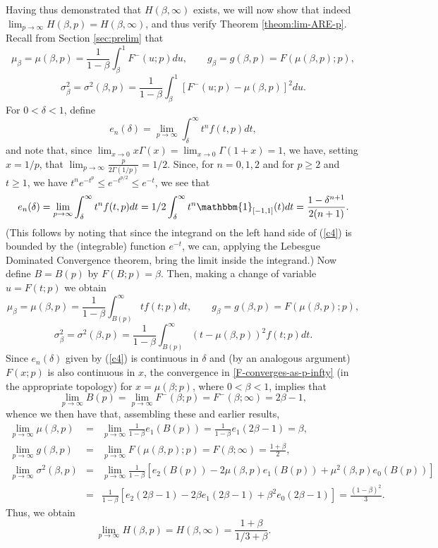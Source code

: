 \documentclass[11pt]{article}
\newcommand{\be}{\begin{equation}}
\newcommand{\ee}{\end{equation}}
\newcommand{\bas}{\begin{eqnarray*}}
\newcommand{\eas}{\end{eqnarray*}}
\newcommand{\indicator}[1]{\mathbbm{1}_{{#1}}}
\newcommand{\nc}{\normalcolor}
\begin{document}
Having thus demonstrated that $H(\beta,\infty)$ exists, we will now show that
indeed $\lim_{p\rightarrow\infty} H(\beta,p) = H(\beta,\infty)$, and
thus verify  Theorem \ref{theom:lim-ARE-p}.  \nc Recall from Section \ref{sec:prelim} that
\[
\mu_{\beta} = \mu(\beta,p) =\frac{1}{1-\beta} \int_{\beta}^1 F^{-}(u;p)du, \qquad
g_{\beta} = g(\beta,p) =F(\mu(\beta,p);p), 
\]
\[
\sigma_{\beta}^2 = \sigma^2 (\beta,p) = \frac{1}{1-\beta} \int_{\beta}^1 [F^{-}(u;p)-\mu(\beta,p)]^2 du.
\] 
For $0 < \delta < 1$, define 
\[ 
e_n(\delta) =\lim_{p \rightarrow \infty} \int_{\delta}^\infty t^n
f(t,p) dt, 
\]
and note that,  since $\lim_{x\rightarrow
  0}x\Gamma(x)=\lim_{x\rightarrow 0}\Gamma(1+x)=1$, we have, setting
$x=1/p$, that \nc $\lim_{p \rightarrow \infty} \frac{p}{2\Gamma(1/p)} = 1/2$.
Since, for $n=0,1,2$ and for $p \ge 2$ and $t \ge 1$, we have $t^n e^{-t^p} \le e^{-t^{p/2}} \le e^{-t}$, we see that 
\be \label{c4}
e_n(\delta) =\lim_{p \rightarrow \infty} \int_{\delta}^\infty t^n f(t,p) dt = 1/2 \int_{\delta}^\infty t^n \indicator{[-1,1]}(t) dt = \frac{1-\delta^{n+1}}{2(n+1)}.
\ee
 (This follows by noting that since the integrand on the left hand side
of (\ref{c4}) is bounded by the (integrable) function $e^{-t}$, we
can, applying the Lebesgue Dominated Convergence theorem, bring the
limit inside the integrand.) \nc Now define $B = B(p)$ by $F(B;p) = \beta$. Then, making a change of variable $u = F(t;p)$ we obtain
\[
\mu_{\beta} = \mu(\beta,p) = \frac{1}{1-\beta} \int_{B(p)}^{\infty} t f(t;p) dt, \qquad
g_{\beta} = g(\beta,p) =F(\mu(\beta,p);p), 
\]
\[
\sigma_{\beta}^2 = \sigma^2 (\beta,p) = \frac{1}{1-\beta} \int_{B(p)}^{\infty} (t-\mu(\beta,p))^2 f(t;p) dt.
\]
%
Since $e_n(\delta)$ given by (\ref{c4}) is continuous in $\delta$ and
(by an analogous argument) $F(x;p)$ is also continuous in $x$, the
convergence in \eqref{F-converges-as-p-infty} (in
the appropriate topology)  for $x=\mu(\beta;p)$, where $0 < \beta <1$, implies that
\[
\lim_{p \rightarrow \infty} B(p) = \lim_{p \rightarrow \infty} F^{-}(\beta;p) = F^{-}(\beta;\infty) = 2\beta -1,
\]
whence we then have that, assembling these and earlier results, \nc  
\bas
\lim_{p \rightarrow \infty} \mu(\beta,p) &=& \lim_{p \rightarrow \infty} \frac{1}{1-\beta} e_1(B(p)) = \frac{1}{1-\beta} e_1(2\beta -1) = \beta, \\
\lim_{p \rightarrow \infty} g(\beta,p) &=& \lim_{p \rightarrow \infty} F(\mu(\beta,p); p) = F(\beta;\infty) = \frac{1+\beta}{2},  \\
\lim_{p \rightarrow \infty} \sigma^2(\beta,p) &=& \lim_{p \rightarrow \infty} \frac{1}{1-\beta} \left[ e_2(B(p)) - 2\mu(\beta,p) e_1(B(p)) + \mu^2(\beta,p) e_0(B(p)) \right] \\
&=&  \frac{1}{1-\beta} \left[ e_2(2\beta -1) - 2\beta e_1(2\beta -1) + {\beta}^2 e_0(2\beta -1)\right] = \frac{(1-\beta)^2}{3}.
\eas
Thus, we obtain
\be \label{L_4}
\lim_{p \rightarrow \infty} H(\beta,p) = H(\beta,\infty) =  \frac{1+\beta}{1/3 + \beta}.
\ee
\end{document}
